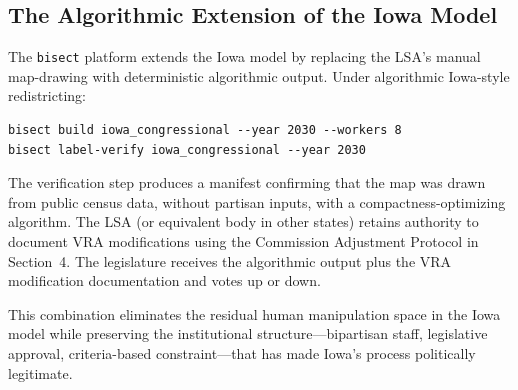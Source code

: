 \subsection{The Algorithmic Extension of the Iowa Model}

The \texttt{bisect} platform extends the Iowa model by replacing the LSA's manual map-drawing with deterministic algorithmic output. Under algorithmic Iowa-style redistricting:
\begin{verbatim}
bisect build iowa_congressional --year 2030 --workers 8
bisect label-verify iowa_congressional --year 2030
\end{verbatim}
The verification step produces a manifest confirming that the map was drawn from public census data, without partisan inputs, with a compactness-optimizing algorithm. The LSA (or equivalent body in other states) retains authority to document VRA modifications using the Commission Adjustment Protocol in Section~4. The legislature receives the algorithmic output plus the VRA modification documentation and votes up or down.

This combination eliminates the residual human manipulation space in the Iowa model while preserving the institutional structure---bipartisan staff, legislative approval, criteria-based constraint---that has made Iowa's process politically legitimate.
